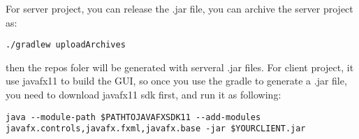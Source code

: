 For server project, you can release the .jar file, you can archive the server project as:

\begin{lstlisting}
./gradlew uploadArchives
\end{lstlisting}

then the repos foler will be generated with serveral .jar files.
For client project, it use javafx11 to build the GUI, so once you use the gradle to generate a .jar file, you need to download javafx11 sdk first, and run it as following:

\begin{lstlisting}
java --module-path $PATHTOJAVAFXSDK11 --add-modules javafx.controls,javafx.fxml,javafx.base -jar $YOURCLIENT.jar
\end{lstlisting}

\clearpage